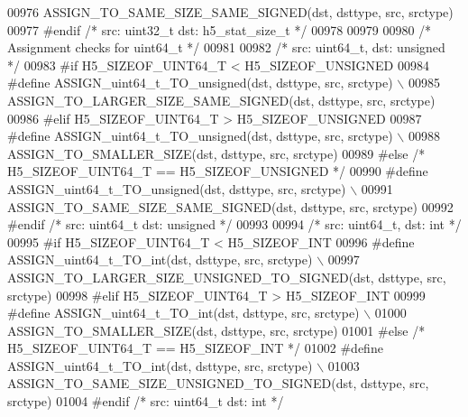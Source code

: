 \begin{DoxyCode}
00976 \textcolor{preprocessor}{        ASSIGN\_TO\_SAME\_SIZE\_SAME\_SIGNED(dst, dsttype, src, srctype)}
00977 \textcolor{preprocessor}{#endif }\textcolor{comment}{/* src: uint32\_t dst: h5\_stat\_size\_t */}\textcolor{preprocessor}{}
00978 
00979 
00980 \textcolor{comment}{/* Assignment checks for uint64\_t */}
00981 
00982 \textcolor{comment}{/* src: uint64\_t, dst: unsigned */}
00983 \textcolor{preprocessor}{#if H5\_SIZEOF\_UINT64\_T < H5\_SIZEOF\_UNSIGNED}
00984 \textcolor{preprocessor}{    #define ASSIGN\_uint64\_t\_TO\_unsigned(dst, dsttype, src, srctype) \(\backslash\)}
00985 \textcolor{preprocessor}{        ASSIGN\_TO\_LARGER\_SIZE\_SAME\_SIGNED(dst, dsttype, src, srctype)}
00986 \textcolor{preprocessor}{#elif H5\_SIZEOF\_UINT64\_T > H5\_SIZEOF\_UNSIGNED}
00987 \textcolor{preprocessor}{    #define ASSIGN\_uint64\_t\_TO\_unsigned(dst, dsttype, src, srctype) \(\backslash\)}
00988 \textcolor{preprocessor}{        ASSIGN\_TO\_SMALLER\_SIZE(dst, dsttype, src, srctype)}
00989 \textcolor{preprocessor}{#else }\textcolor{comment}{/* H5\_SIZEOF\_UINT64\_T == H5\_SIZEOF\_UNSIGNED */}\textcolor{preprocessor}{}
00990 \textcolor{preprocessor}{    #define ASSIGN\_uint64\_t\_TO\_unsigned(dst, dsttype, src, srctype) \(\backslash\)}
00991 \textcolor{preprocessor}{        ASSIGN\_TO\_SAME\_SIZE\_SAME\_SIGNED(dst, dsttype, src, srctype)}
00992 \textcolor{preprocessor}{#endif }\textcolor{comment}{/* src: uint64\_t dst: unsigned */}\textcolor{preprocessor}{}
00993 
00994 \textcolor{comment}{/* src: uint64\_t, dst: int */}
00995 \textcolor{preprocessor}{#if H5\_SIZEOF\_UINT64\_T < H5\_SIZEOF\_INT}
00996 \textcolor{preprocessor}{    #define ASSIGN\_uint64\_t\_TO\_int(dst, dsttype, src, srctype) \(\backslash\)}
00997 \textcolor{preprocessor}{        ASSIGN\_TO\_LARGER\_SIZE\_UNSIGNED\_TO\_SIGNED(dst, dsttype, src, srctype)}
00998 \textcolor{preprocessor}{#elif H5\_SIZEOF\_UINT64\_T > H5\_SIZEOF\_INT}
00999 \textcolor{preprocessor}{    #define ASSIGN\_uint64\_t\_TO\_int(dst, dsttype, src, srctype) \(\backslash\)}
01000 \textcolor{preprocessor}{        ASSIGN\_TO\_SMALLER\_SIZE(dst, dsttype, src, srctype)}
01001 \textcolor{preprocessor}{#else }\textcolor{comment}{/* H5\_SIZEOF\_UINT64\_T == H5\_SIZEOF\_INT */}\textcolor{preprocessor}{}
01002 \textcolor{preprocessor}{    #define ASSIGN\_uint64\_t\_TO\_int(dst, dsttype, src, srctype) \(\backslash\)}
01003 \textcolor{preprocessor}{        ASSIGN\_TO\_SAME\_SIZE\_UNSIGNED\_TO\_SIGNED(dst, dsttype, src, srctype)}
01004 \textcolor{preprocessor}{#endif }\textcolor{comment}{/* src: uint64\_t dst: int */}\textcolor{preprocessor}{}

\end{DoxyCode}
